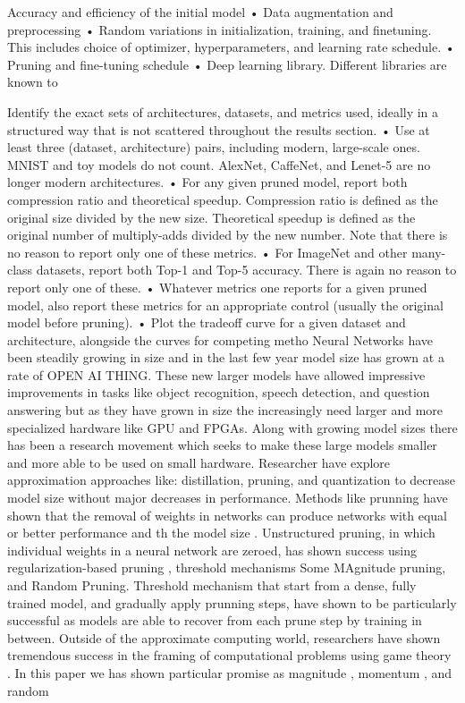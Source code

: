 \documentclass{article}
\begin{document}
Accuracy and efficiency of the initial model
• Data augmentation and preprocessing
• Random variations in initialization, training, and finetuning. This includes choice of optimizer, hyperparameters, and learning rate schedule.
• Pruning and fine-tuning schedule
• Deep learning library. Different libraries are known to

Identify the exact sets of architectures, datasets, and
metrics used, ideally in a structured way that is not scattered throughout the results section.
• Use at least three (dataset, architecture) pairs, including
modern, large-scale ones. MNIST and toy models do
not count. AlexNet, CaffeNet, and Lenet-5 are no longer
modern architectures.
• For any given pruned model, report both compression
ratio and theoretical speedup. Compression ratio is defined as the original size divided by the new size. Theoretical speedup is defined as the original number of
multiply-adds divided by the new number. Note that
there is no reason to report only one of these metrics.
• For ImageNet and other many-class datasets, report both
Top-1 and Top-5 accuracy. There is again no reason to
report only one of these.
• Whatever metrics one reports for a given pruned model,
also report these metrics for an appropriate control (usually the original model before pruning).
• Plot the tradeoff curve for a given dataset and architecture, alongside the curves for competing metho
Neural Networks have been steadily growing in size and in the last few year model size has grown at a rate of \cite{} OPEN AI THING. These new larger models have allowed impressive improvements in tasks like object recognition, speech detection, and question answering but as they have grown in size the increasingly need larger and more specialized hardware like GPU and FPGAs. Along with growing model sizes there has been a research movement which seeks to make these large models smaller and more able to be used on small hardware. Researcher have explore approximation approaches like: distillation, pruning, and quantization to decrease model size without major decreases in performance. Methods like prunning have shown that the removal of weights in networks can produce networks with equal or better performance and th the model size \cite{}. Unstructured pruning, in which individual weights in a neural network are zeroed, has shown success using regularization-based pruning \cite{Molchanov2017VariationalDS}, threshold mechanisms \cite{} Some MAgnitude pruning, and Random Pruning. Threshold mechanism that start from a dense, fully trained model, and gradually apply prunning steps, have shown to be particularly successful as models are able to recover from each prune step by training in between. Outside of the approximate computing world, researchers have shown tremendous success in the framing of computational problems using game theory \cite{Goodfellow2014GenerativeAN}. 
In this paper we has shown particular promise as magnitude \cite{}, momentum \cite{}, and random
\end{document}
